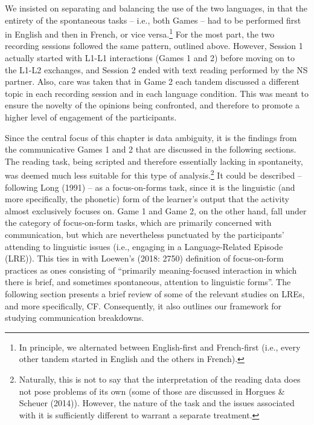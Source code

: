 \documentclass[12pt]{article}
\newenvironment{styleStandard}{\setlength\leftskip{0cm}\setlength\rightskip{0cm plus 1fil}\setlength\parindent{0cm}\setlength\parfillskip{0pt plus 1fil}\setlength\parskip{0cm plus 1pt}\writerlistparindent\writerlistleftskip\leavevmode\normalfont\normalsize\writerlistlabel\ignorespaces}{\unskip\vspace{0cm plus 1pt}\par}
\newcommand\writerlistleftskip{}
\newcommand\writerlistparindent{}
\newcommand\writerlistlabel{}
\begin{document}
\begin{styleStandard}
We insisted on separating and balancing the use of the two languages, in that the entirety of the spontaneous tasks – i.e., both Games – had to be performed first in English and then in French, or vice versa.\footnote{\textrm{ In principle, we alternated between English-first and French-first (i.e., every other tandem started in English and the others in French).}} For the most part, the two recording sessions followed the same pattern, outlined above. However, Session 1 actually started with L1-L1 interactions (Games 1 and 2) before moving on to the L1-L2 exchanges, and Session 2 ended with text reading performed by the NS partner. Also, care was taken that in Game 2 each tandem discussed a different topic in each recording session and in each language condition. This was meant to ensure the novelty of the opinions being confronted, and therefore to promote a higher level of engagement of the participants.
\end{styleStandard}

\begin{styleStandard}
Since the central focus of this chapter is data ambiguity, it is the findings from the communicative Games 1 and 2 that are discussed in the following sections. The reading task, being scripted and therefore essentially lacking in spontaneity, was deemed much less suitable for this type of analysis.\footnote{\textrm{ Naturally, this is not to say that the interpretation of the reading data does not pose problems of its own (some of those are discussed in Horgues \& Scheuer (2014)). However, the nature of the task and the issues associated with it is sufficiently different to warrant a separate treatment.}} It could be described – following Long (1991) – as a focus-on-forms task, since it is the linguistic (and more specifically, the phonetic) form of the learner’s output that the activity almost exclusively focuses on. Game 1 and Game 2, on the other hand, fall under the category of focus-on-form tasks, which are primarily concerned with communication, but which are nevertheless punctuated by the participants’ attending to linguistic issues (i.e., engaging in a Language-Related Episode (LRE)). This ties in with Loewen’s (2018: 2750) definition of focus-on-form practices as ones consisting of “primarily meaning-focused interaction in which there is brief, and sometimes spontaneous, attention to linguistic forms”. The following section presents a brief review of some of the relevant studies on LREs, and more specifically, CF. Consequently, it also outlines our framework for studying communication breakdowns.
\end{styleStandard}
\end{document}
